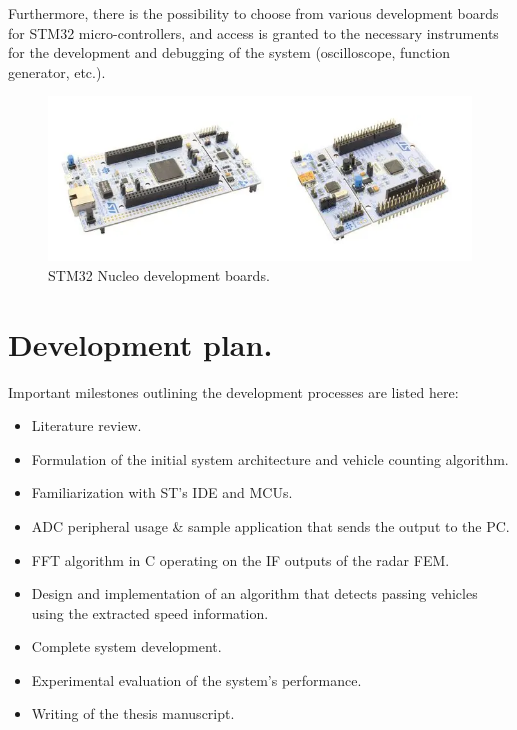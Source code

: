 \documentclass[12pt]{article}
\begin{document}
Furthermore, there is the possibility to choose from various development boards for STM32 micro-controllers, and access is granted to the necessary instruments for the development and debugging of the system (oscilloscope, function generator, etc.).

\begin{figure}[H]
\centering
\captionsetup{justification=centering}
\includegraphics[width=0.7\linewidth,keepaspectratio]{pics/stm32.png}
\caption{ STM32 Nucleo development boards. \label{image:dev_kits}}
\end{figure}

\section*{Development plan.}

Important milestones outlining the development processes are listed here:

\begin{itemize}

\item Literature review.

\item Formulation of the initial system architecture and vehicle counting algorithm.

\item Familiarization with ST's IDE and MCUs.

\item ADC peripheral usage \& sample application that sends the output to the PC.

\item FFT algorithm in C operating on the IF outputs of the radar FEM.

\item Design and implementation of an algorithm that detects passing vehicles using the extracted speed information.

\item Complete system development.

\item Experimental evaluation of the system's performance.

\item Writing of the thesis manuscript.

 
\end{itemize}
\end{document}

